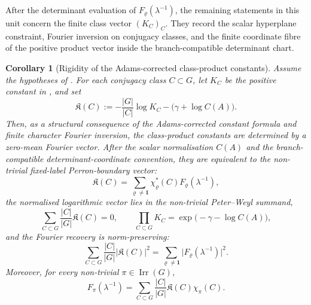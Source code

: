 \documentclass[11pt,a4paper]{amsart}
\theoremstyle{plain}
\newtheorem{corollary}[theorem]{Corollary}
\theoremstyle{definition}
\theoremstyle{remark}
\DeclareMathOperator{\Irr}{Irr}
\newcommand{\abs}[1]{\lvert #1 \rvert}
\begin{document}
After the determinant evaluation of \(F_\varrho(\lambda^{-1})\), the remaining
statements in this unit concern the finite class vector \((K_C)_C\).  They
record the scalar hyperplane constraint, Fourier inversion on conjugacy
classes, and the finite coordinate fibre of the positive product vector inside
the branch-compatible determinant chart.

\begin{corollary}[Rigidity of the Adams-corrected class-product constants]
  \label{cor:class-product-constant-rigidity}
  Assume the hypotheses of .  For each
  conjugacy class \(C\subset G\), let \(K_C\) be the positive constant in
  , and set
  \begin{equation}\label{eq:class-product-normalised-log-vector}
    \mathfrak K(C)
    :=
    -\frac{|G|}{|C|}\log K_C-\bigl(\gamma+\log C(A)\bigr).
  \end{equation}
  Then, as a structural consequence of the Adams-corrected constant formula
  and finite character Fourier inversion, the class-product constants are
  determined by a zero-mean Fourier vector.  After the scalar normalisation
  \(C(A)\) and the branch-compatible determinant-coordinate convention, they
  are equivalent to the non-trivial fixed-label Perron-boundary vector:
  \begin{equation}\label{eq:class-product-rigidity-forward}
    \mathfrak K(C)
    =
    \sum_{\varrho\neq\mathbf1}
      \chi_\varrho^\ast(C)F_\varrho(\lambda^{-1}),
  \end{equation}
  the normalised logarithmic vector lies in the non-trivial Peter--Weyl
  summand,
  \begin{equation}\label{eq:class-product-rigidity-hyperplane}
    \sum_{C\subset G}\frac{|C|}{|G|}\mathfrak K(C)=0,
    \qquad
    \prod_{C\subset G}K_C=
      \exp\!\bigl(-\gamma-\log C(A)\bigr),
  \end{equation}
  and the Fourier recovery is norm-preserving:
  \begin{equation}\label{eq:class-product-rigidity-parseval}
    \sum_{C\subset G}\frac{|C|}{|G|}\abs{\mathfrak K(C)}^2
    =
    \sum_{\varrho\neq\mathbf1}
      \abs{F_\varrho(\lambda^{-1})}^2.
  \end{equation}
  Moreover, for every non-trivial \(\pi\in\Irr(G)\),
  \begin{equation}\label{eq:class-product-rigidity-inverse}
    F_\pi(\lambda^{-1})
    =
    \sum_{C\subset G}\frac{|C|}{|G|}\mathfrak K(C)\chi_\pi(C).
  \end{equation}

\end{corollary}
\end{document}
